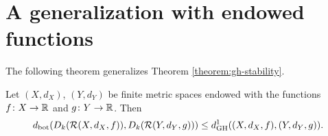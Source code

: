 \section{A generalization with endowed functions}  \label{sec:hausdorf-stab-generaliced}

The following theorem generalizes Theorem \ref{theorem:gh-stability}.

\begin{theorem}
    Let $ (X, d_X) $, $ (Y, d_Y) $ be finite metric spaces endowed with the functions $ f \colon X \to \mathbb R $ and $ g \colon Y \to \mathbb R $. Then
    \begin{equation}
        d_{\operatorname{bot}}(D_k(\mathcal{R}(X, d_X, f)), D_k(\mathcal{R}(Y, d_Y, g))) \leq d_{\operatorname{GH}}^1((X, d_X, f), (Y, d_Y, g)).
    \end{equation}
\end{theorem}
